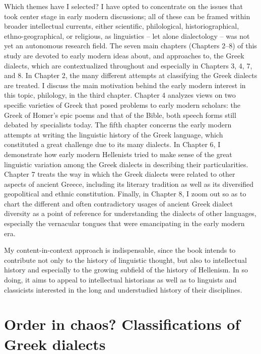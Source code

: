 Which themes have I selected? I have opted to concentrate on the issues that took center stage in early modern discussions; all of these can be framed within broader intellectual currents, either scientific, philological, historiographical, ethno-geographical, or religious, as linguistics – let alone dialectology – was not yet an autonomous research field. The seven main chapters (Chapters 2–8) of this study are devoted to early modern ideas about, and approaches to, the Greek dialects, which are contextualized throughout and especially in Chapters 3, 4, 7, and 8. In Chapter 2, the many different attempts at classifying the Greek dialects are treated. I discuss the main motivation behind the early modern interest in this topic, philology, in the third chapter. Chapter 4 analyzes views on two specific varieties of Greek that posed problems to early modern scholars: the Greek of Homer’s epic poems and that of the Bible, both speech forms still debated by specialists today. The fifth chapter concerns the early modern attempts at writing the linguistic history of the Greek language, which constituted a great challenge due to its many dialects. In Chapter 6, I demonstrate how early modern Hellenists tried to make sense of the great linguistic variation among the Greek dialects in describing their particularities. Chapter 7 treats the way in which the Greek dialects were related to other aspects of ancient Greece, including its literary tradition as well as its diversified geopolitical and ethnic constitution. Finally, in Chapter 8, I zoom out so as to chart the different and often contradictory usages of ancient Greek dialect diversity as a point of reference for understanding the dialects of other languages, especially the vernacular tongues that were emancipating in the early modern era.

My content-in-context approach is indispensable, since the book intends to contribute not only to the history of linguistic thought, but also to intellectual history and especially to the growing subfield of the history of Hellenism. In so doing, it aims to appeal to intellectual historians as well as to linguists and classicists interested in the long and understudied history of their disciplines.

\chapter{Order in chaos? Classifications of Greek dialects}

